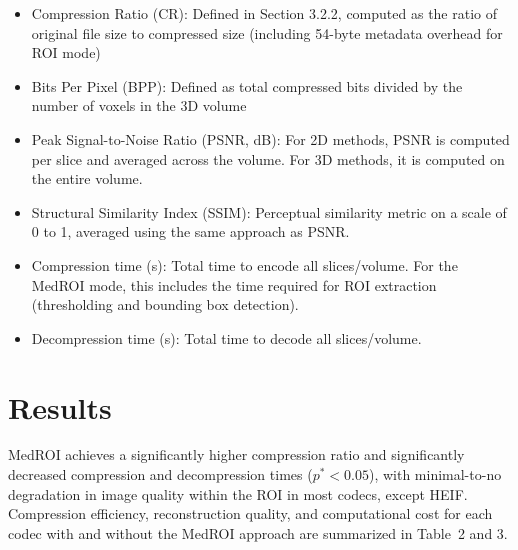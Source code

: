 \documentclass[runningheads]{llncs}
\begin{document}
\vspace{+0.1cm}

\vspace{-0.2cm}
\begin{itemize} 
\item  Compression Ratio (CR): Defined in Section 3.2.2, computed as the ratio of original file size to compressed size (including 54-byte metadata overhead for ROI mode)
\item  Bits Per Pixel (BPP): Defined as total compressed bits divided by the number of voxels in the 3D volume
\end{itemize} 
\vspace{-0.11cm}

\vspace{-0.2cm}
\begin{itemize} 
\item  Peak Signal-to-Noise Ratio (PSNR, dB): For 2D methods, PSNR is computed per slice and averaged across the volume. For 3D methods, it is computed on the entire volume.
\item  Structural Similarity Index (SSIM): Perceptual similarity metric on a scale of 0 to 1, averaged using the same approach as PSNR.
\end{itemize} 
\vspace{-0.11cm}

\vspace{-0.2cm}
\begin{itemize} 
\item Compression time (s): Total time to encode all slices/volume. For the MedROI mode, this includes the time required for ROI extraction (thresholding and bounding box detection).
\item Decompression time (s): Total time to decode all slices/volume.
\end{itemize} 


\label{results}
\section{Results}

MedROI achieves a significantly higher compression ratio and significantly decreased compression and decompression times ($p^*<0.05$), with minimal-to-no degradation in image quality within the ROI in most codecs, except HEIF. Compression efficiency, reconstruction quality, and computational cost for each codec with and without the MedROI approach are summarized in Table~2 and 3.
\end{document}
